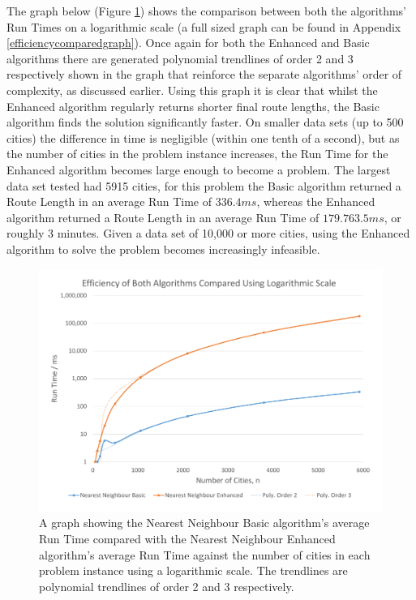 \documentclass[conference,backref=page]{acmsiggraph}
\begin{document}
The graph below (Figure \ref{efficiencycomparedcolumngraph}) shows the comparison between both the algorithms' Run Times on a logarithmic scale (a full sized graph can be found in Appendix \ref{efficiencycomparedgraph}). Once again for both the Enhanced and Basic algorithms there are generated polynomial trendlines of order 2 and 3 respectively shown in the graph that reinforce the separate algorithms' order of complexity, as discussed earlier. Using this graph it is clear that whilst the Enhanced algorithm regularly returns shorter final route lengths, the Basic algorithm finds the solution significantly faster. On smaller data sets (up to 500 cities) the difference in time is negligible (within one tenth of a second), but as the number of cities in the problem instance increases, the Run Time for the Enhanced algorithm becomes large enough to become a problem. The largest data set tested had 5915 cities, for this problem the Basic algorithm returned a Route Length in an average Run Time of $336.4ms$, whereas the Enhanced algorithm returned a Route Length in an average Run Time of $179.763.5ms$, or roughly 3 minutes. Given a data set of 10,000 or more cities, using the Enhanced algorithm to solve the problem becomes increasingly infeasible. 

\begin{figure}[h]
	\includegraphics[width=\columnwidth]{images/efficiency_compared_column.pdf}
	\caption{A graph showing the Nearest Neighbour Basic algorithm's average Run Time compared with the Nearest Neighbour Enhanced algorithm's average Run Time against the number of cities in each problem instance using a logarithmic scale. The trendlines are polynomial trendlines of order 2 and 3 respectively.}
	\label{efficiencycomparedcolumngraph}
\end{figure}
\end{document}
